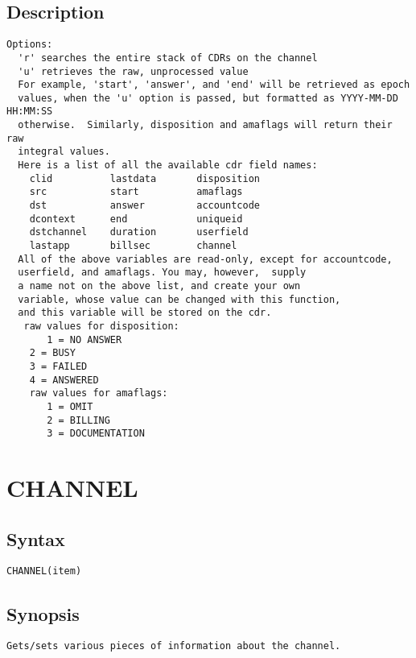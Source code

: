 \subsection{Description}
\begin{verbatim}
Options:
  'r' searches the entire stack of CDRs on the channel
  'u' retrieves the raw, unprocessed value
  For example, 'start', 'answer', and 'end' will be retrieved as epoch
  values, when the 'u' option is passed, but formatted as YYYY-MM-DD HH:MM:SS
  otherwise.  Similarly, disposition and amaflags will return their raw
  integral values.
  Here is a list of all the available cdr field names:
    clid          lastdata       disposition
    src           start          amaflags
    dst           answer         accountcode
    dcontext      end            uniqueid
    dstchannel    duration       userfield
    lastapp       billsec        channel
  All of the above variables are read-only, except for accountcode,
  userfield, and amaflags. You may, however,  supply
  a name not on the above list, and create your own
  variable, whose value can be changed with this function,
  and this variable will be stored on the cdr.
   raw values for disposition:
       1 = NO ANSWER
	2 = BUSY
	3 = FAILED
	4 = ANSWERED
    raw values for amaflags:
       1 = OMIT
       2 = BILLING
       3 = DOCUMENTATION

\end{verbatim}


\section{CHANNEL}
\subsection{Syntax}
\begin{verbatim}
CHANNEL(item)
\end{verbatim}
\subsection{Synopsis}
\begin{verbatim}
Gets/sets various pieces of information about the channel.
\end{verbatim}
